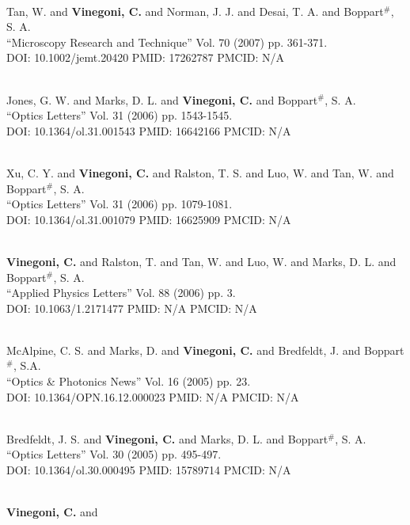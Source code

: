  \\ Tan, W. and {\bf Vinegoni, C.} and Norman, J. J. and Desai, T. A. and Boppart$^\#$, S. A. \\ ``Microscopy Research and Technique'' Vol. 70 (2007) pp. 361-371. \\ DOI: 10.1002/jemt.20420 PMID: 17262787 PMCID: N/A\item {} \\ Jones, G. W. and Marks, D. L. and {\bf Vinegoni, C.} and Boppart$^\#$, S. A. \\ ``Optics Letters'' Vol. 31 (2006) pp. 1543-1545. \\ DOI: 10.1364/ol.31.001543 PMID: 16642166 PMCID: N/A\item {} \\ Xu, C. Y. and {\bf Vinegoni, C.} and Ralston, T. S. and Luo, W. and Tan, W. and Boppart$^\#$, S. A. \\ ``Optics Letters'' Vol. 31 (2006) pp. 1079-1081. \\ DOI: 10.1364/ol.31.001079 PMID: 16625909 PMCID: N/A\item {} \\ {\bf Vinegoni, C.} and Ralston, T. and Tan, W. and Luo, W. and Marks, D. L. and Boppart$^\#$, S. A. \\ ``Applied Physics Letters'' Vol. 88 (2006) pp. 3. \\ DOI: 10.1063/1.2171477 PMID: N/A PMCID: N/A\item {} \\ McAlpine, C. S. and Marks, D. and {\bf Vinegoni, C.} and Bredfeldt, J. and Boppart$^\#$, S.A. \\ ``Optics & Photonics News'' Vol. 16 (2005) pp. 23. \\ DOI: 10.1364/OPN.16.12.000023 PMID: N/A PMCID: N/A\item {} \\ Bredfeldt, J. S. and {\bf Vinegoni, C.} and Marks, D. L. and Boppart$^\#$, S. A. \\ ``Optics Letters'' Vol. 30 (2005) pp. 495-497. \\ DOI: 10.1364/ol.30.000495 PMID: 15789714 PMCID: N/A\item {} \\ {\bf Vinegoni, C.} and 